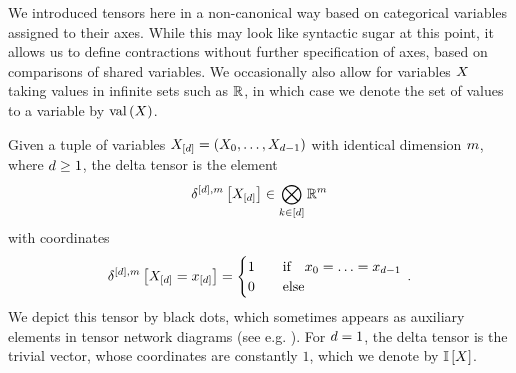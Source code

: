 We introduced tensors here in a non-canonical way based on categorical variables assigned to their axes.
While this may look like syntactic sugar at this point, it allows us to define contractions without further specification of axes, based on comparisons of shared variables.
We occasionally also allow for variables $X$ taking values in infinite sets such as $\mathbb{R}$, in which case we denote the set of values to a variable by $\mathrm{val}\left(X\right)$.


\begin{example}
    \label{exa:diracDelta}
    Given a tuple of variables $X_{[d]}=(X_{0},\ldots,X_{d-1})$ with identical dimension $m$, where $d\geq 1$, the delta tensor is the element
    \begin{align*}
        \delta^{[d],m}\left[X_{[d]}\right] \in \bigotimes_{k\in[d]} \mathbb{R}^{m}
    \end{align*}
    with coordinates
    \begin{align*}
        \delta^{[d],m}\left[X_{[d]}=x_{[d]}\right] =
        \begin{cases}
            1 \quad & \text{if}\quad x_{0} = \ldots = x_{d-1} \\
            0 & \text{else}
        \end{cases} \, .
    \end{align*}
    We depict this tensor by black dots, which sometimes appears as auxiliary elements in tensor network diagrams (see e.g. ).
    For $d=1$, the delta tensor is the trivial vector, whose coordinates are constantly $1$, which we denote by $\mathbb{I}\left[X\right]$.
\end{example}

